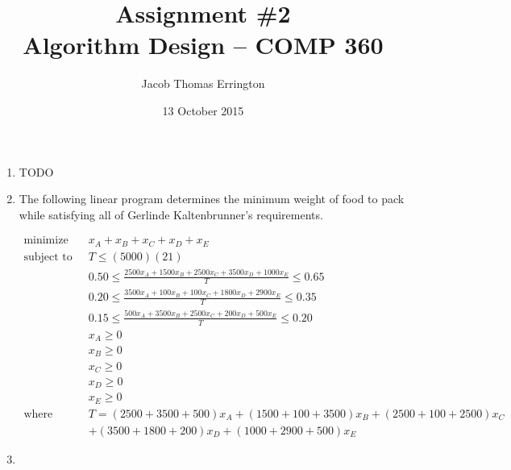 \documentclass[letterpaper,11pt]{article}
\author{Jacob Thomas Errington}
\title{Assignment \#2 \\ Algorithm Design -- COMP 360}
\date{13 October 2015}
\begin{document}
\maketitle

\begin{enumerate}

    \item TODO


    \item The following linear program determines the minimum weight of food
        to pack while satisfying all of Gerlinde Kaltenbrunner's requirements.

        \begin{align*}
            \text{minimize} \quad
                & x_A + x_B + x_C + x_D + x_E                                                         \\
            \text{subject to} \quad
                & T    \leq (5000)(21)                                                                \\
                & 0.50 \leq \frac{2500x_A + 1500x_B + 2500x_C + 3500x_D + 1000x_E}{T} \leq 0.65       \\
                & 0.20 \leq \frac{3500x_A + 100x_B  + 100x_C  + 1800x_D + 2900x_E}{T} \leq 0.35       \\
                & 0.15 \leq \frac{500x_A  + 3500x_B + 2500x_C + 200x_D  + 500x_E }{T} \leq 0.20       \\
                & x_A  \geq 0                                                                         \\
                & x_B  \geq 0                                                                         \\
                & x_C  \geq 0                                                                         \\
                & x_D  \geq 0                                                                         \\
                & x_E  \geq 0                                                                         \\
            \text{where} \quad
                & T    = (2500 + 3500 + 500) x_A + (1500 + 100 + 3500) x_B + (2500 + 100 + 2500) x_C  \\
                &      + (3500 + 1800 + 200) x_D + (1000 + 2900 + 500) x_E
        \end{align*}

    \item


\end{enumerate}
\end{document}
